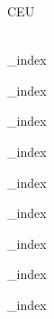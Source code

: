 \documentclass[a4paper,12pt]{article}
\begin{document}


\begin{center}

{\Huge CEU} \\
{\LARGE \Modality} \\ [1.5cm]

\end{center}



{_index}


{_index}


{_index}


\ifteams
	{_index}
\fi


{_index}


{_index}


{_index}


{_index}


{_index}
\end{document}
